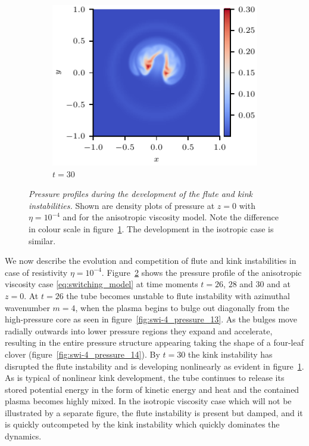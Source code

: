 \documentclass[fleqn,usenatbib]{mnras}
\newcommand{\rs}[2]{{#2}}
\newcommand{\mycaption}[2]{\caption[#1]{\emph{#1} #2}}
\begin{document}
\begin{figure}
\begin{subfigure}{0.32\textwidth}
      \includegraphics[width=\linewidth]{swi-4_pressure_15.pdf}
      \caption{$t=30$}
      \label{fig:swi-4_pressure_15}
    \end{subfigure}
\mycaption{Pressure profiles during the development of the
  \rs{fluting}{flute} and kink instabilities.}{Shown are
  \rs{slices}{density plots} of pressure \rs{through}{at} $z=0$
  \rs{where}{with} $\eta = 10^{-4}$ 
  and \rs{the viscosity model is \rs{switching}{anisotropic}}{for the
    anisotropic viscosity model}. Note the difference in colour scale
  in figure~\ref{fig:swi-4_pressure_15}. The development in the
  isotropic case is similar.} 
\label{fig:kink_pressure_slices-4}%
\end{figure}

\rs{}{We now describe the evolution and competition of flute and
  kink instabilities in case of resistivity $\eta=10^{-4}$.}
\rs{The}{Figure}~\ref{fig:kink_pressure_slices-4} shows the pressure profile
\rs{the viscosity model is switching for times}{of the \rs{switching}{anisotropic} viscosity case 
\eqref{eq:switching_model} at
time moments} $t=26$, $28$ and $30$ and \rs{through}{at} $z=0$. At $t=26$
the tube becomes unstable to \rs{the $m=4$}{} \rs{fluting}{flute}
instability \rs{}{with azimuthal wavenumber $m=4$}, when the
plasma begins to \rs{(slightly)}{} bulge out diagonally from the
high-pressure core as seen in figure~\ref{fig:swi-4_pressure_13}. As  
the bulges move radially outwards into lower pressure regions they
expand and accelerate, resulting in the entire pressure structure
appearing \rs{clover-shaped}{taking the shape of a four-leaf clover} (figure~\ref{fig:swi-4_pressure_14}). By
$t=30$ the kink instability has disrupted the \rs{fluting}{flute}
instability and is developing nonlinearly
\rs{}{as evident in} figure~\ref{fig:swi-4_pressure_15}. As is typical of nonlinear kink
development, the tube continues to release its stored potential energy
\rs{as}{in the form of} kinetic energy and heat and the contained plasma becomes highly
mixed. In the \rs{unseen}{} isotropic \rs{}{viscosity} case
\rs{}{which will not be illustrated by a separate figure}, the
\rs{fluting}{flute} instability is present but damped, and \rs{}{it is
  quickly outcompeted by} the kink instability \rs{}{which} quickly dominates the dynamics. 
\end{document}
